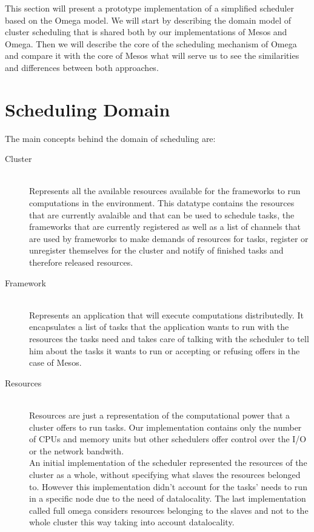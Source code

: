 \documentclass{report}                     %
\begin{document}
This section will present a prototype implementation of a simplified
scheduler based on the Omega model. We will start by describing the
domain model of cluster scheduling that is shared both by our
implementations of Mesos and Omega. Then we will describe the core of
the scheduling mechanism of Omega and compare it with the core of
Mesos what will serve us to see the similarities and differences
between both approaches.

\section{Scheduling Domain}

The main concepts behind the domain of scheduling are:

\begin{description}
  \item[Cluster] \hfill \\
  Represents all the available resources available for the frameworks
  to run computations in the environment. This datatype contains the
  resources that are currently avalaible and that can be used to
  schedule tasks, the frameworks that are currently registered as well
  as a list of channels that are used by frameworks to make demands of
  resources for tasks, register or unregister themselves for the
  cluster and notify of finished tasks and therefore released resources.
  \item[Framework] \hfill \\
  Represents an application that will execute computations
  distributedly. It encapsulates a list of tasks that the application
  wants to run with the resources the tasks need and takes care of
  talking with the scheduler to tell him about the tasks it wants to
  run or accepting or refusing offers in the case of Mesos.
  \item[Resources] \hfill \\
  Resources are just a representation of the computational power that
  a cluster offers to run tasks. Our implementation contains only the
  number of CPUs and memory units but other schedulers offer control
  over the I/O or the network bandwith. \\

  An initial implementation of the scheduler represented the resources
  of the cluster as a whole, without specifying what slaves the
  resources belonged to. However this implementation didn't account
  for the tasks' needs to run in a specific node due to the need of
  datalocality. The last implementation called full omega considers
  resources belonging to the slaves and not to the whole cluster this
  way taking into account datalocality.
  

\end{description}
\end{document}
